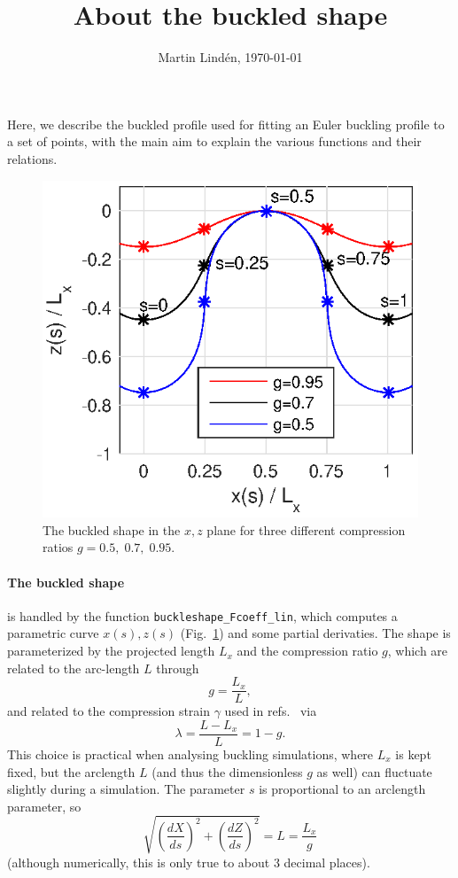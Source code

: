 \documentclass[11pt,a4paper,twocolumn]{article}
\title{About the buckled shape}
\author{Martin Lind\'en,  \today}
\date{}
\begin{document}
\maketitle 
Here, we describe the buckled profile used for fitting an Euler
buckling profile to a set of points, with the main aim to explain the
various functions and their relations.

\begin{figure}
  \includegraphics{figures/buckledshape.eps}
  \caption{\label{fig:buckle} The buckled shape in the $x,z$ plane for
    three different compression ratios $g=0.5,\;0.7,\;0.95$.}
\end{figure}
\paragraph{The buckled shape}
is handled by the function \texttt{buckleshape\_Fcoeff\_lin}, which
computes a parametric curve $x(s),z(s)$ (Fig.~\ref{fig:buckle}) and
some partial derivaties. The shape is parameterized by the projected
length $L_x$ and the compression ratio $g$, which are related to the
arc-length $L$ through
\begin{equation}
  g=\frac{L_x}{L},
\end{equation}
and related to the compression strain $\gamma$ used in
refs.~\cite{gomez2016,hu2013} via
\begin{equation}
  \lambda=\frac{L-L_x}{L}=1-g.
\end{equation}
This choice is practical when analysing buckling simulations, where
$L_x$ is kept fixed, but the arclength $L$ (and thus the dimensionless
$g$ as well) can fluctuate slightly during a simulation. The parameter
$s$ is proportional to an arclength parameter, so 
\begin{equation}
  \sqrt{\left(\frac{dX}{ds}\right)^2+\left(\frac{dZ}{ds}\right)^2}
  =L=\frac{L_x}{g}
\end{equation}
(although numerically, this is only true to about 3 decimal places).
\end{document}
